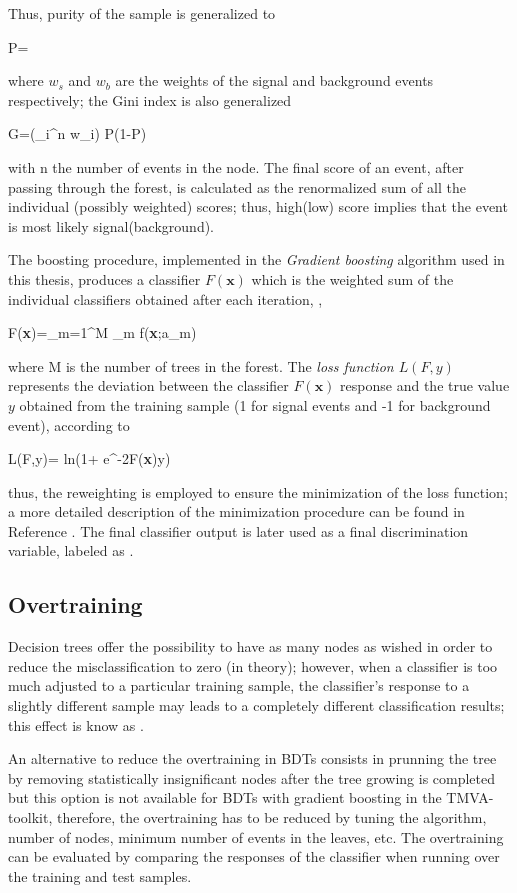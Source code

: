 Thus, purity of the sample is generalized to 

\beqn
P=
\eeqn

\noindent where $w_s$ and $w_b$ are the weights of the signal and background events respectively; the Gini index is also generalized

\beqn
G=\left(\sum_i^n w_i\right) P(1-P)
\eeqn

\noindent with n the number of events in the node. The final score of an event, after passing through the forest, is calculated as the renormalized sum of all the individual (possibly weighted) scores; thus, high(low) score implies that the event is most likely signal(background).   

The boosting procedure, implemented in the  \textit{Gradient boosting} algorithm used in this thesis, produces a classifier $F(\textbf{x})$ which is the weighted sum of the individual classifiers obtained after each iteration, \ie,   

\beqn
F(\textbf{x})=\sum_{m=1}^M \beta_m f(\textbf{x};a_m)
\eeqn

\noindent where M is the number of trees in the forest. The \textit{loss function $L(F,y)$} represents the deviation between the classifier $F(\textbf{x})$ response and the true value $y$ obtained from the training sample (1 for signal events and -1 for background event), according to 

\beqn
L(F,y)= \textrm{ln}(1+ e^{-2F(\textbf{x})y})
\eeqn

\noindent thus, the reweighting is employed to ensure the minimization of the loss function; a more detailed description of the minimization procedure can be found in Reference \cite{friedman}. The final classifier output is later used as a final discrimination variable, labeled as .

\subsection{Overtraining}

Decision trees offer the possibility to have as many nodes as wished in order to reduce the misclassification to zero (in theory); however, when a classifier is too much adjusted to a particular training sample, the classifier's response to a slightly different sample may leads to a completely different classification results; this effect is know as .

An alternative to reduce the overtraining in BDTs consists in prunning the tree by removing statistically insignificant nodes after the tree growing is completed but this option is not available for BDTs with gradient boosting in the TMVA-toolkit, therefore, the overtraining has to be reduced by tuning the algorithm, number of nodes, minimum number of events in the leaves, etc. The overtraining can be evaluated by comparing the responses of the classifier when running over the training and test samples.   


